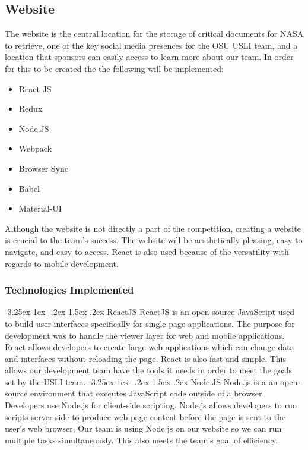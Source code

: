 \documentclass[onecolumn, draftclsnofoot, 10pt, compsoc]{IEEEtran}
\makeatletter
\renewcommand\paragraph{\@startsection{paragraph}{4}{\z@}%
                                     {-3.25ex\@plus -1ex \@minus -.2ex}%
                                     {1.5ex \@plus .2ex}%
                                     {\normalfont\normalsize\bfseries}}
\makeatother
\begin{document}
\newpage
\subsection{Website}
The website is the central location for the storage of critical documents for NASA to retrieve, one of the key social media presences for the OSU USLI team, and a location that sponsors can easily access to learn more about our team. In order for this to be created the the following will be implemented: 
\begin{itemize}
    \item React JS
    \item Redux
    \item Node.JS
    \item Webpack
    \item Browser Sync
    \item Babel
    \item Material-UI
\end{itemize}
Although the website is not directly a part of the competition, creating a website is crucial to the team's success. The website will be aesthetically pleasing, easy to navigate, and easy to access. React is also used because of the versatility with regards to mobile development.  

\subsubsection{Technologies Implemented}
\paragraph{ReactJS}
ReactJS is an open-source JavaScript used to build user interfaces specifically for single page applications. The purpose for development was to handle the viewer layer for web and mobile applications. React allows developers to create large web applications which can change data and interfaces without reloading the page. React is also fast and simple. This allows our development team have the tools it needs in order to meet the goals set by the USLI team. 
\paragraph{Node.JS}
Node.js is a an open-source environment that executes JavaScript code outside of a browser. Developers use Node.js for client-side scripting. Node.js allows developers to run scripts server-side to produce web page content before the page is sent to the user's web browser. Our team is using Node.js on our website so we can run multiple tasks simultaneously. This also meets the team's goal of efficiency. 
\end{document}
